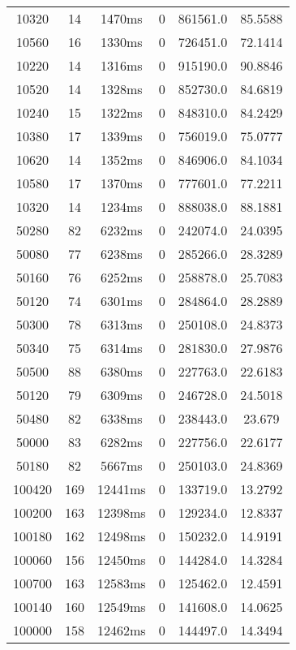 \documentclass[./main.tex]{subfiles}
\begin{document}
\begin{table}
\begin{tabular}{ c | c | c | c | c | c }
        10320 & 14 & 1470ms & 0 & 861561.0 & 85.5588 \\
        10560 & 16 & 1330ms & 0 & 726451.0 & 72.1414 \\
        10220 & 14 & 1316ms & 0 & 915190.0 & 90.8846 \\
        10520 & 14 & 1328ms & 0 & 852730.0 & 84.6819 \\
        \rowcolor{lightgray} 10240 & 15 & 1322ms & 0 & 848310.0 & 84.2429 \\
        10380 & 17 & 1339ms & 0 & 756019.0 & 75.0777 \\
        10620 & 14 & 1352ms & 0 & 846906.0 & 84.1034 \\
        10580 & 17 & 1370ms & 0 & 777601.0 & 77.2211 \\
        10320 & 14 & 1234ms & 0 & 888038.0 & 88.1881 \\
        \hline
        50280 & 82 & 6232ms & 0 & 242074.0 & 24.0395 \\
        50080 & 77 & 6238ms & 0 & 285266.0 & 28.3289 \\
        50160 & 76 & 6252ms & 0 & 258878.0 & 25.7083 \\
        50120 & 74 & 6301ms & 0 & 284864.0 & 28.2889 \\
        50300 & 78 & 6313ms & 0 & 250108.0 & 24.8373 \\
        50340 & 75 & 6314ms & 0 & 281830.0 & 27.9876 \\
        50500 & 88 & 6380ms & 0 & 227763.0 & 22.6183 \\
        50120 & 79 & 6309ms & 0 & 246728.0 & 24.5018 \\
        50480 & 82 & 6338ms & 0 & 238443.0 & 23.679 \\
        50000 & 83 & 6282ms & 0 & 227756.0 & 22.6177 \\
        \rowcolor{lightgray} 50180 & 82 & 5667ms & 0 & 250103.0 & 24.8369 \\
        \hline
        100420 & 169 & 12441ms & 0 & 133719.0 & 13.2792 \\
        100200 & 163 & 12398ms & 0 & 129234.0 & 12.8337 \\
        100180 & 162 & 12498ms & 0 & 150232.0 & 14.9191 \\
        100060 & 156 & 12450ms & 0 & 144284.0 & 14.3284 \\
        100700 & 163 & 12583ms & 0 & 125462.0 & 12.4591 \\
        100140 & 160 & 12549ms & 0 & 141608.0 & 14.0625 \\
        100000 & 158 & 12462ms & 0 & 144497.0 & 14.3494 \\

\end{tabular}
\end{table}
\end{document}
